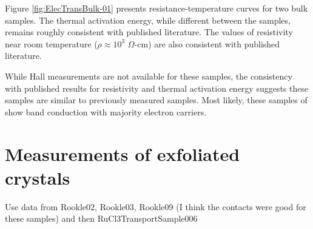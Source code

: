 Figure \ref{fig:ElecTransBulk-01} presents resistance-temperature curves for two bulk \rucl samples. The thermal activation energy, while different between the samples, remains roughly consistent with published literature. The values of resistivity near room temperature ($\rho \approx 10^{3}$ $\Omega$-cm) are also consistent with published literature.

While Hall measurements are not available for these samples, the consistency with published results for resistivity and thermal activation energy suggests these samples are similar to previously measured samples. Most likely, these samples of \rucl show band conduction with majority electron carriers.

\section{Measurements of exfoliated \texorpdfstring{\rucl}{RuCl3}crystals}

Use data from Rookle02, Rookle03, Rookle09 (I think the contacts were good for these samples) and then RuCl3TransportSample006